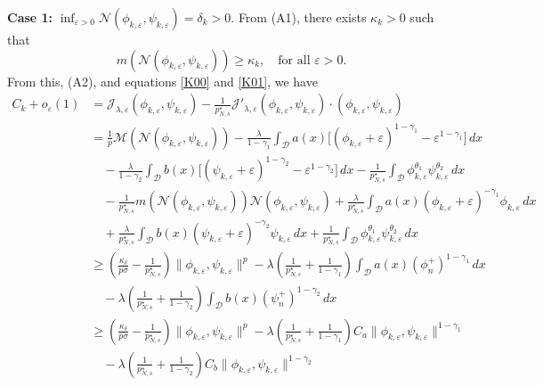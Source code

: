 \documentclass[10pt,a4paper]{amsart}
\numberwithin{equation}{section}
\begin{document}
\noindent\textbf{Case 1:}
$\inf_{\varepsilon>0} \mathcal{N}(\phi_{k,\varepsilon},\psi_{k,\varepsilon})=\delta_k>0$.
From  (A1), there exists $\kappa_k>0$ such that
\[
m(\mathcal{N}(\phi_{k,\varepsilon},\psi_{k,\varepsilon}))\geq \kappa_k,\quad
 \text{for all } \varepsilon>0.
\]
From this, (A2), and equations \eqref{K00} and \eqref{K01}, we have
\begin{align*}
C_k+o_\varepsilon(1)
&=\mathcal{J}_{\lambda,\varepsilon}(\phi_{k,\varepsilon},\psi_{k,\varepsilon})-\frac{1}{p^\star_{N,s}}\mathcal{J}'_{\lambda,\varepsilon}(\phi_{k,\varepsilon},\psi_{k,\varepsilon})\cdot (\phi_{k,\varepsilon},\psi_{k,\varepsilon})\\
&=\frac{1}{p}\mathscr{M}(\mathcal{N}(\phi_{k,\varepsilon},\psi_{k,\varepsilon}))-\frac{\lambda}{1-\gamma_1}\int_\mathcal{D} a(x)\Big[(\phi_{k,\varepsilon}+\varepsilon)^{1-\gamma_1}-\varepsilon^{1-\gamma_1}\Big]\,dx\\
&\quad-\frac{\lambda}{1-\gamma_2}\int_\mathcal{D} b(x)\Big[(\psi_{k,\varepsilon}+\varepsilon)^{1-\gamma_2}-\varepsilon^{1-\gamma_2}\Big]\,dx-\frac{1}{p^\star_{N,s}}\int_\mathcal{D}  \phi_{k,\varepsilon}^{\theta_1}\psi_{k,\varepsilon}^{\theta_2}\,dx\\
&\quad-\frac{1}{p^\star_{N,s}}m(\mathcal{N}(\phi_{k,\varepsilon},\psi_{k,\varepsilon}))\mathcal{N}(\phi_{k,\varepsilon},\psi_{k,\varepsilon})+\frac{\lambda}{p^\star_{N,s}}\int_\mathcal{D} a(x) (\phi_{k,\varepsilon}+\varepsilon)^{-\gamma_1}\phi_{k,\varepsilon}\,dx \\
&\quad+\frac{\lambda}{p^\star_{N,s}}\int_\mathcal{D}b(x)(\psi_{k,\varepsilon}+\varepsilon)^{-\gamma_2}\psi_{k,\varepsilon}\,dx+\frac{1}{p^\star_{N,s}}\int_\mathcal{D}\phi_{k,\varepsilon}^{\theta_1}\psi_{k,\varepsilon}^{\theta_2}\,dx\\
&\geq(\frac{\kappa_\delta}{p\sigma}-\frac{1}{p^\star_{N,s}})\| \phi_{k,\varepsilon},\psi_{k,\varepsilon}\|^p-\lambda(\frac{1}{p^\star_{N,s}}+\frac{1}{1-\gamma_1})\int_\mathcal{D} a(x)(\phi_n^+)^{1-\gamma_1}\,dx\\
&\quad-\lambda(\frac{1}{p^\star_{N,s}}+\frac{1}{1-\gamma_2})\int_\mathcal{D} b(x)(\psi_n^+)^{1-\gamma_2}\,dx\\
&\geq(\frac{\kappa_\delta}{p\sigma}-\frac{1}{p^\star_{N,s}})\| \phi_{k,\varepsilon},\psi_{k,\varepsilon}\|^p-\lambda(\frac{1}{p^\star_{N,s}}+\frac{1}{1-\gamma_1})C_a \| \phi_{k,\varepsilon},\psi_{k,\varepsilon}\|^{1-\gamma_1}\\
&\quad-\lambda(\frac{1}{p^\star_{N,s}}+\frac{1}{1-\gamma_2})C_b \| 
\phi_{k,\varepsilon},\psi_{k,\varepsilon}\|^{1-\gamma_2}
\end{align*}
\end{document}
